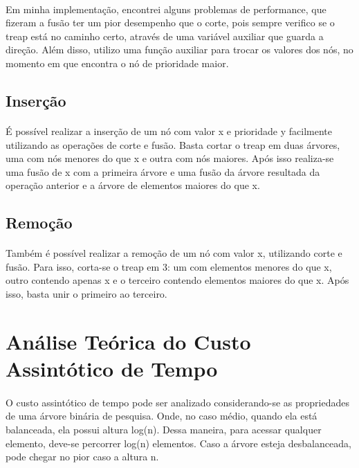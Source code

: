 \documentclass[a4paper, 12pt]{article}
\begin{document}
\paragraph{}
Em minha implementação, encontrei alguns problemas de performance, que fizeram a fusão ter um pior desempenho que o corte, pois sempre verifico se o treap está no caminho certo, através de uma variável auxiliar que guarda a direção. Além disso, utilizo uma função auxiliar para trocar os valores dos nós, no momento em que encontra o nó de prioridade maior.


\subsection{Inserção}
\paragraph{}
É possível realizar a inserção de um nó com valor x e prioridade y facilmente utilizando as operações de corte e fusão. Basta cortar o treap em duas árvores, uma com nós menores do que x e outra com nós maiores. Após isso realiza-se uma fusão de x com a primeira árvore e uma fusão da árvore resultada da operação anterior e a árvore de elementos maiores do que x.




\subsection{Remoção}
\paragraph{}
Também é possível realizar a remoção de um nó com valor x, utilizando corte e fusão. Para isso, corta-se o treap em 3: um com elementos menores do que x, outro contendo apenas x e o terceiro contendo elementos maiores do que x. Após isso, basta unir o primeiro ao terceiro.

\section{Análise Teórica do Custo Assintótico de Tempo}
\paragraph{}
O custo assintótico de tempo pode ser analizado considerando-se as propriedades de uma árvore binária de pesquisa. Onde, no caso médio, quando ela está balanceada, ela possui altura log(n). Dessa maneira, para acessar qualquer elemento, deve-se percorrer log(n) elementos. Caso a árvore esteja desbalanceada, pode chegar no pior caso a altura n.
\end{document}
